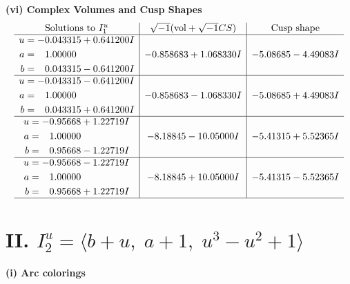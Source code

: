 \documentclass[1p]{elsarticle_modified}
\theoremstyle{definition}
\newcommand{\I}{\sqrt{-1}}
\begin{document}
\newpage\flushleft \textbf{(vi) Complex Volumes and Cusp Shapes}
$$\begin{array}{c|c|c}  
\text{Solutions to }I^u_{1}& \I (\text{vol} + \sqrt{-1}CS) & \text{Cusp shape}\\
 \hline 
\begin{aligned}
u &= -0.043315 + 0.641200 I \\
a &= \phantom{-}1.00000\phantom{ +0.000000I} \\
b &= \phantom{-}0.043315 - 0.641200 I\end{aligned}
 & -0.858683 + 1.068330 I & -5.08685 - 4.49083 I \\ \hline\begin{aligned}
u &= -0.043315 - 0.641200 I \\
a &= \phantom{-}1.00000\phantom{ +0.000000I} \\
b &= \phantom{-}0.043315 + 0.641200 I\end{aligned}
 & -0.858683 - 1.068330 I & -5.08685 + 4.49083 I \\ \hline\begin{aligned}
u &= -0.95668 + 1.22719 I \\
a &= \phantom{-}1.00000\phantom{ +0.000000I} \\
b &= \phantom{-}0.95668 - 1.22719 I\end{aligned}
 & -8.18845 - 10.05000 I & -5.41315 + 5.52365 I \\ \hline\begin{aligned}
u &= -0.95668 - 1.22719 I \\
a &= \phantom{-}1.00000\phantom{ +0.000000I} \\
b &= \phantom{-}0.95668 + 1.22719 I\end{aligned}
 & -8.18845 + 10.05000 I & -5.41315 - 5.52365 I\\
 \hline 
 \end{array}$$\newpage\newpage\renewcommand{\arraystretch}{1}
\centering \section*{II. $I^u_{2}= \langle b+u,\;a+1,\;u^3- u^2+1 \rangle$}
\flushleft \textbf{(i) Arc colorings}\\
\end{document}
